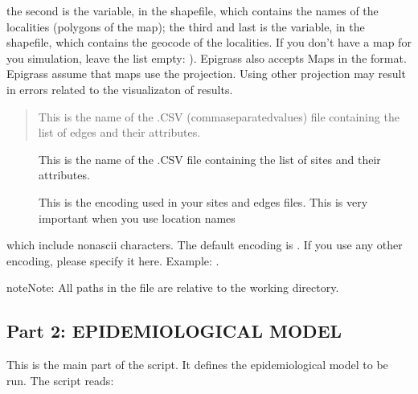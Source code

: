 \documentclass[letterpaper,10pt,english]{sphinxmanual}
\begin{document}
the second  is the variable, in the shapefile, which contains the names of the localities (polygons of the map);
the third and last is the variable, in the shapefile, which contains the geocode of the localities.
If you don’t have a map for you simulation, leave the list empty:  ). Epigrass also accepts Maps in the
 format. Epigrass assume that maps use the  projection. Using other projection may result in
errors related to the visualizaton of results.
\begin{quote}

This is the name of the .CSV (comma\sphinxhyphen{}separated\sphinxhyphen{}values) file containing the list of edges and their attributes.
\end{quote}
\begin{description}
\item[{}] \leavevmode
This is the name of the .CSV file containing the list of sites and their attributes.

\item[{}] \leavevmode
This is the encoding used in your sites and edges files. This is very important when you use location names

\end{description}

which include non\sphinxhyphen{}ascii characters. The default encoding is . If you use any other encoding, please
specify it here. Example: .

\begin{sphinxadmonition}{note}{Note:}
All paths in the  file are relative to the working directory.
\end{sphinxadmonition}


\subsection{Part 2: EPIDEMIOLOGICAL MODEL}
\label{\detokenize{using:part-2-epidemiological-model}}
This is the main part of the script. It defines the epidemiological model to be run.
The script reads:

\begin{sphinxVerbatim}[commandchars=\\\{\}]
  
\end{sphinxVerbatim}
\end{document}
